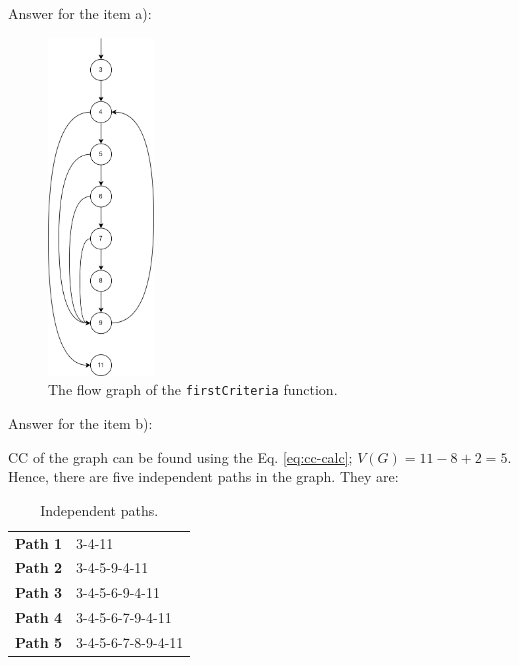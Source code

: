 \begin{solution}
    Answer for the item a):
    
    \begin{figure}[H]
        \centering
        \includegraphics[width=0.25\textwidth]{images/exercise-8a-solution.png}
        \caption{The flow graph of the \lstinline!firstCriteria! function.}
        \label{fig:ex8-fg}
    \end{figure}
    
    Answer for the item b):
    
    CC of the graph can be found using the Eq. \ref{eq:cc-calc}; $V(G) = 11 - 8 + 2 = 5$. Hence, there are five independent paths in the graph. They are:
    \begin{table}[H]
        \centering
        \renewcommand{\arraystretch}{1.2}
        \caption{Independent paths.}
        \label{tab:ex8-indep-paths}
        \begin{tabular}{p{}p{}}
            \toprule
            \textbf{Path 1} & 3-4-11\\
            \textbf{Path 2} & 3-4-5-9-4-11\\
            \textbf{Path 3} & 3-4-5-6-9-4-11\\
            \textbf{Path 4} & 3-4-5-6-7-9-4-11\\
            \textbf{Path 5} & 3-4-5-6-7-8-9-4-11\\
            \bottomrule
        \end{tabular}
    \end{table}
    

\end{solution}

